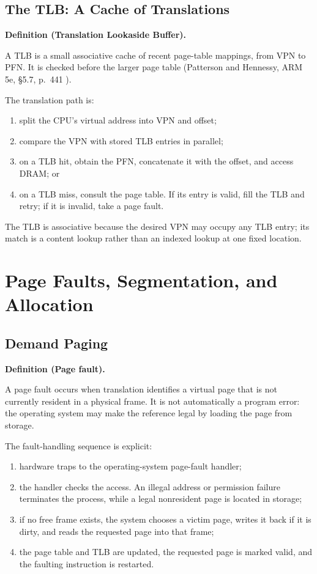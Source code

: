 \documentclass[11pt]{article}
\newenvironment{definitionbox}[1]{%
  \par\noindent\textbf{Definition (#1).}\ \itshape
}{\par\vspace{0.3em}}
\begin{document}
\subsection{The TLB: A Cache of Translations}

\begin{definitionbox}{Translation Lookaside Buffer}
A TLB is a small associative cache of recent page-table mappings, from VPN to
PFN. It is checked before the larger page table (Patterson and Hennessy, ARM
5e, \S5.7, p.~441 \cite[\S5.7, p.~441]{PattersonHennessy2017_computer_organization_design}).
\end{definitionbox}

The translation path is:
\begin{enumerate}
  \item split the CPU's virtual address into VPN and offset;
  \item compare the VPN with stored TLB entries in parallel;
  \item on a TLB hit, obtain the PFN, concatenate it with the offset, and
        access DRAM; or
  \item on a TLB miss, consult the page table. If its entry is valid, fill the
        TLB and retry; if it is invalid, take a page fault.
\end{enumerate}
The TLB is associative because the desired VPN may occupy any TLB entry; its
match is a content lookup rather than an indexed lookup at one fixed location.

\section{Page Faults, Segmentation, and Allocation}
\label{sec:management}

\subsection{Demand Paging}

\begin{definitionbox}{Page fault}
A page fault occurs when translation identifies a virtual page that is not
currently resident in a physical frame. It is not automatically a program
error: the operating system may make the reference legal by loading the page
from storage.
\end{definitionbox}

The fault-handling sequence is explicit:
\begin{enumerate}
  \item hardware traps to the operating-system page-fault handler;
  \item the handler checks the access. An illegal address or permission
        failure terminates the process, while a legal nonresident page is
        located in storage;
  \item if no free frame exists, the system chooses a victim page, writes it
        back if it is dirty, and reads the requested page into that frame;
  \item the page table and TLB are updated, the requested page is marked valid,
        and the faulting instruction is restarted.
\end{enumerate}
\end{document}
